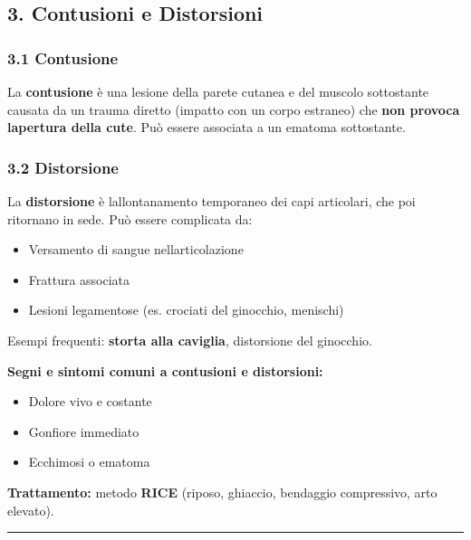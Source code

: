 \documentclass[a4paper,11pt]{article}
\providecommand{\tightlist}{%
  \setlength{\itemsep}{0pt}\setlength{\parskip}{0pt}}
\begin{document}
\subsection{3. Contusioni e Distorsioni}\label{contusioni-e-distorsioni}

\subsubsection{3.1 Contusione}\label{contusione}

La \textbf{contusione} è una lesione della parete cutanea e del muscolo
sottostante causata da un trauma diretto (impatto con un corpo estraneo)
che \textbf{non provoca l\textquotesingle apertura della cute}. Può
essere associata a un ematoma sottostante.

\subsubsection{3.2 Distorsione}\label{distorsione}

La \textbf{distorsione} è l\textquotesingle allontanamento temporaneo
dei capi articolari, che poi ritornano in sede. Può essere complicata
da:

\begin{itemize}
      \tightlist
      \item
            Versamento di sangue nell\textquotesingle articolazione
      \item
            Frattura associata
      \item
            Lesioni legamentose (es. crociati del ginocchio, menischi)
\end{itemize}

Esempi frequenti: \textbf{storta alla caviglia}, distorsione del
ginocchio.

\textbf{Segni e sintomi comuni a contusioni e distorsioni:}

\begin{itemize}
      \tightlist
      \item
            Dolore vivo e costante
      \item
            Gonfiore immediato
      \item
            Ecchimosi o ematoma
\end{itemize}

\textbf{Trattamento:} metodo \textbf{RICE} (riposo, ghiaccio, bendaggio
compressivo, arto elevato).

\begin{center}\rule{0.5\linewidth}{0.5pt}\end{center}
\end{document}
